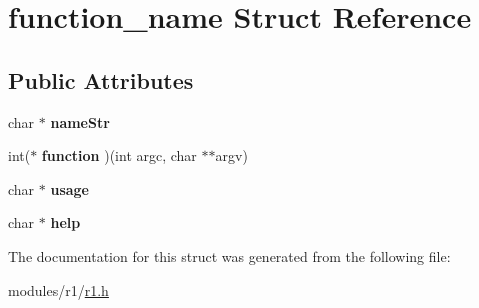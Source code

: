 \hypertarget{structfunction__name}{}\section{function\+\_\+name Struct Reference}
\label{structfunction__name}
\subsection*{Public Attributes}
\begin{DoxyCompactItemize}
\item 
char $\ast$ {\bfseries name\+Str}\hypertarget{structfunction__name_a7a94f7f31542a15b63160b6b213e0bcb}{}\label{structfunction__name_a7a94f7f31542a15b63160b6b213e0bcb}

\item 
int($\ast$ {\bfseries function} )(int argc, char $\ast$$\ast$argv)\hypertarget{structfunction__name_ad80214b3eea6c438c13ff5461c5350ab}{}\label{structfunction__name_ad80214b3eea6c438c13ff5461c5350ab}

\item 
char $\ast$ {\bfseries usage}\hypertarget{structfunction__name_a30f593e52febda0cc9d9703b9015fb0f}{}\label{structfunction__name_a30f593e52febda0cc9d9703b9015fb0f}

\item 
char $\ast$ {\bfseries help}\hypertarget{structfunction__name_ac0f73e570d7d03a9f378a70e6d4d5632}{}\label{structfunction__name_ac0f73e570d7d03a9f378a70e6d4d5632}

\end{DoxyCompactItemize}


The documentation for this struct was generated from the following file\+:\begin{DoxyCompactItemize}
\item 
modules/r1/\hyperlink{r1_8h}{r1.\+h}\end{DoxyCompactItemize}
